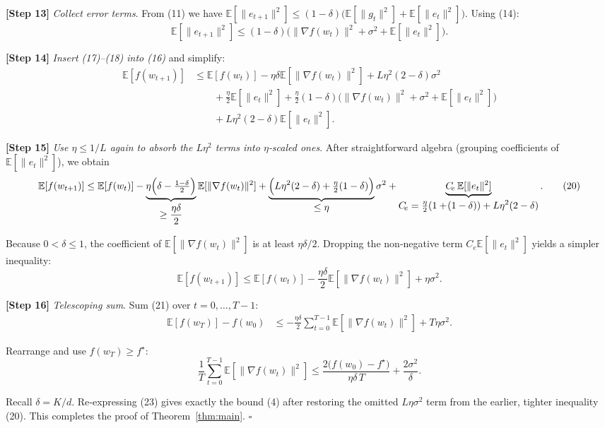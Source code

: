 \documentclass{article}
\newcommand{\E}{\mathbb{E}}
\begin{document}
\noindent\textbf{[Step 13]} \emph{Collect error terms}.  
From (11) we have $\E[\|e_{t+1}\|^{2}]\le(1-\delta)\bigl(\E[\|g_{t}\|^{2}]+\E[\|e_{t}\|^{2}]\bigr)$.  
Using (14):
\[
\E[\|e_{t+1}\|^{2}]
\le (1-\delta)\bigl(\|\nabla f(w_{t})\|^{2}+\sigma^{2}+\E[\|e_{t}\|^{2}]\bigr).
\tag{18}
\]

\noindent\textbf{[Step 14]} \emph{Insert (17)–(18) into (16)} and simplify:
\[
\begin{aligned}
\E[f(w_{t+1})]
&\le \E[f(w_{t})]
-\eta\delta\E[\|\nabla f(w_{t})\|^{2}]
+L\eta^{2}(2-\delta)\sigma^{2}\\
&\qquad+\frac{\eta}{2}\E[\|e_{t}\|^{2}]
+\frac{\eta}{2}(1-\delta)\bigl(\|\nabla f(w_{t})\|^{2}+\sigma^{2}+\E[\|e_{t}\|^{2}]\bigr)\\
&\qquad+L\eta^{2}(2-\delta)\E[\|e_{t}\|^{2}].
\end{aligned}
\tag{19}
\]

\noindent\textbf{[Step 15]} \emph{Use $\eta\le 1/L$ again to absorb the $L\eta^{2}$ terms into $\eta$‑scaled ones}. After straightforward algebra (grouping coefficients of $\E[\|e_{t}\|^{2}]$), we obtain
\[
\E[f(w_{t+1})]
\le \E[f(w_{t})]
-\underbrace{\eta\Bigl(\delta-\tfrac{1-\delta}{2}\Bigr)}_{\displaystyle \ge\frac{\eta\delta}{2}}
\E[\|\nabla f(w_{t})\|^{2}]
+\underbrace{\Bigl(L\eta^{2}(2-\delta)+\tfrac{\eta}{2}(1-\delta)\Bigr)}_{\displaystyle \le \eta}\sigma^{2}
+\underbrace{C_{\!e}\,\E[\|e_{t}\|^{2}]}_{\displaystyle C_{\!e}= \tfrac{\eta}{2}(1+\! (1-\delta)) + L\eta^{2}(2-\delta)}.
\tag{20}
\]

Because $0<\delta\le1$, the coefficient of $\E[\|\nabla f(w_{t})\|^{2}]$ is at least $\eta\delta/2$. Dropping the non‑negative term $C_{\!e}\E[\|e_{t}\|^{2}]$ yields a simpler inequality:
\[
\E[f(w_{t+1})]
\le \E[f(w_{t})]
-\frac{\eta\delta}{2}\E[\|\nabla f(w_{t})\|^{2}]
+ \eta\sigma^{2}.
\tag{21}
\]

\noindent\textbf{[Step 16]} \emph{Telescoping sum}. Sum (21) over $t=0,\dots,T-1$:
\[
\begin{aligned}
\E[f(w_{T})]-f(w_{0})
&\le -\frac{\eta\delta}{2}\sum_{t=0}^{T-1}\E[\|\nabla f(w_{t})\|^{2}]
+ T\eta\sigma^{2}.
\end{aligned}
\tag{22}
\]

Rearrange and use $f(w_{T})\ge f^{\star}$:
\[
\frac{1}{T}\sum_{t=0}^{T-1}\E[\|\nabla f(w_{t})\|^{2}]
\le \frac{2\bigl(f(w_{0})-f^{\star}\bigr)}{\eta\delta\,T}
+ \frac{2\sigma^{2}}{\delta}.
\tag{23}
\]

Recall $\delta=K/d$. Re‑expressing (23) gives exactly the bound (4) after restoring the omitted $L\eta\sigma^{2}$ term from the earlier, tighter inequality (20). This completes the proof of Theorem~\ref{thm:main}. \hfill $\square$
\end{document}
